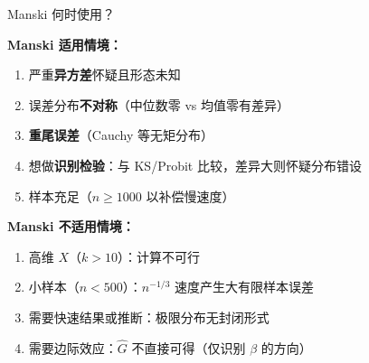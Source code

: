 \documentclass[aspectratio=169, 10pt]{beamer}
\begin{document}
\begin{frame}{Manski 何时使用？}

  \begin{highlightbox}
    \textbf{Manski 适用情境：}
    \begin{enumerate}\setlength{\itemsep}{1pt}
      \item 严重\textbf{异方差}怀疑且形态未知
      \item 误差分布\textbf{不对称}（中位数零 vs 均值零有差异）
      \item \textbf{重尾误差}（Cauchy 等无矩分布）
      \item 想做\textbf{识别检验}：与 KS/Probit 比较，差异大则怀疑分布错设
      \item 样本充足（$n \geq 1000$ 以补偿慢速度）
    \end{enumerate}
  \end{highlightbox}

  \begin{keybox}
    \textbf{Manski 不适用情境：}
    \begin{enumerate}\setlength{\itemsep}{1pt}
      \item 高维 $X$（$k > 10$）：计算不可行
      \item 小样本（$n < 500$）：$n^{-1/3}$ 速度产生大有限样本误差
      \item 需要快速结果或推断：极限分布无封闭形式
      \item 需要边际效应：$\hat G$ 不直接可得（仅识别 $\beta$ 的方向）
    \end{enumerate}
  \end{keybox}

\end{frame}
\end{document}
